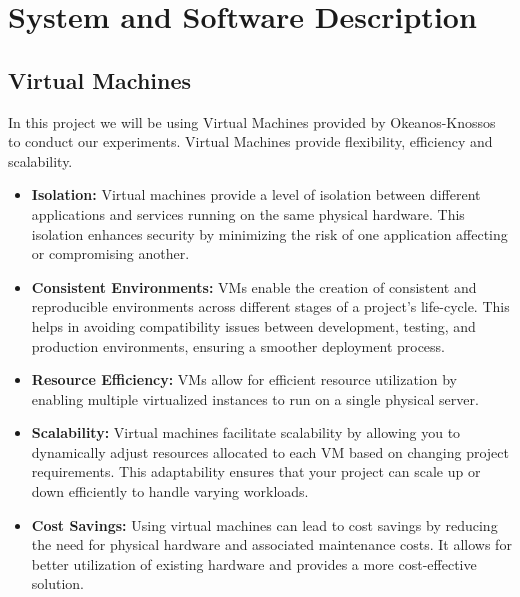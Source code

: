 \documentclass[conference]{IEEEtran}
\begin{document}
\section{System and Software Description}
\subsection{Virtual Machines\cite{b1,b2}}
In this project we will be using Virtual Machines provided by Okeanos-Knossos to conduct our experiments. Virtual Machines provide flexibility, efficiency and scalability.
\begin{itemize}
\item \textbf{Isolation:} Virtual machines provide a level of isolation between different applications and services running on the same physical hardware. This isolation enhances security by minimizing the risk of one application affecting or compromising another.
\item \textbf{Consistent Environments:} VMs enable the creation of consistent and reproducible environments across different stages of a project's life-cycle. This helps in avoiding compatibility issues between development, testing, and production environments, ensuring a smoother deployment process.
\item \textbf{Resource Efficiency:} VMs allow for efficient resource utilization by enabling multiple virtualized instances to run on a single physical server.
\item \textbf{Scalability:} Virtual machines facilitate scalability by allowing you to dynamically adjust resources allocated to each VM based on changing project requirements. This adaptability ensures that your project can scale up or down efficiently to handle varying workloads.
\item \textbf{Cost Savings:} Using virtual machines can lead to cost savings by reducing the need for physical hardware and associated maintenance costs. It allows for better utilization of existing hardware and provides a more cost-effective solution.
\end{itemize}
\end{document}
